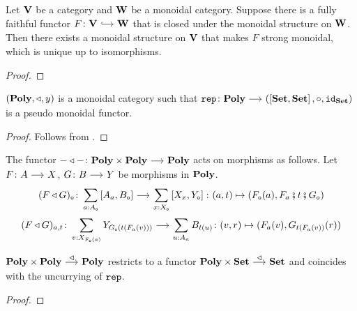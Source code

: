 \documentclass[a4paper,dvipsnames, 11pt]{amsart} %
\begin{document}
\begin{proposition}
	\label{prop:FFInducesMoncat}
	Let $\mathbf{V}$ be a category and $\mathbf{W}$ be a monoidal category.
	Suppose there is a fully faithful functor $F\colon\one{V}\arr[hook]\one{W}$
	that is closed under the monoidal structure on $\mathbf{W}$.
	Then there exists a monoidal structure on $\mathbf{V}$ that makes $F$ strong monoidal,
	which is unique up to isomorphisms.
\end{proposition}
\begin{proof}
\end{proof}
\begin{proposition}
	\label{prop:PolyMonoidalCaty}
	$(\mathbf{Poly},\triangleleft,y)$ is a monoidal category
	such that $\rep\colon\Poly\arr\left(\left[\Set,\Set\right],\circ,\id_\Set\right)$ is a pseudo monoidal functor.
\end{proposition}
\begin{proof}
	Follows from .
\end{proof}
\begin{remark}
	The functor $-\trleft-\colon\Poly\times\Poly\arr\Poly$ acts on morphisms as follows.
	Let $F\colon A\arr X$, $G\colon B\arr Y$ be morphisms in $\mathbf{Poly}$.
	\[
		(F\trleft G)_\ob
		\colon
		\sum_{a\tcolon A_\ob}\left[A_a,B_\ob\right]
		\arr
		\sum_{x\tcolon X_\ob}\left[X_x,Y_\ob\right]
		\colon
		(a,t)\mapsto\left(F_\ob(a),F_{a}\fatsemi t\fatsemi G_{\ob}\right)
	\]
	\[
		(F\trleft G)_{a,t}\colon
		\sum_{v\tcolon X_{F_\ob(a)}}Y_{G_\ob(t(F_{a}(v)))}
		\arr
		\sum_{u\tcolon A_{a}}B_{t(u)}
		\colon
		(v,r)
		\mapsto
		(F_a(v),G_{t(F_a(v))}(r))
	\]
\end{remark}
\begin{lemma}
	\label{lem:trleftRestSets}
	$\Poly\times\Poly\arr"\trleft"\Poly$
	restricts to a functor
	$\Poly\times\Set\arr"\trleft"\Set$
	and coincides with the uncurrying of $\mathtt{rep}$.
\end{lemma}
\begin{proof}
\end{proof}
\end{document}
